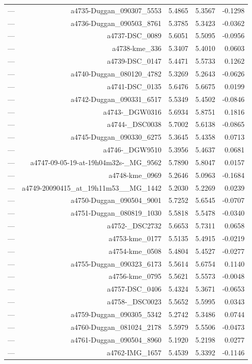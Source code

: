 \begin{table}[htbp]
\begin{tabular}{lrrrr}
— & a4735-Duggan_090307_5553 & 5.4865 & 5.3567 & -0.1298 \\
— & a4736-Duggan_090503_8761 & 5.3785 & 5.3423 & -0.0362 \\
— & a4737-DSC_0089 & 5.6051 & 5.5095 & -0.0956 \\
— & a4738-kme_336 & 5.3407 & 5.4010 & 0.0603 \\
— & a4739-DSC_0147 & 5.4471 & 5.5733 & 0.1262 \\
— & a4740-Duggan_080120_4782 & 5.3269 & 5.2643 & -0.0626 \\
— & a4741-DSC_0135 & 5.6476 & 5.6675 & 0.0199 \\
— & a4742-Duggan_090331_6517 & 5.5349 & 5.4502 & -0.0846 \\
— & a4743-_DGW0316 & 5.6934 & 5.8751 & 0.1816 \\
— & a4744-_DSC0038 & 5.7002 & 5.6138 & -0.0865 \\
— & a4745-Duggan_090330_6275 & 5.3645 & 5.4358 & 0.0713 \\
— & a4746-_DGW9510 & 5.3956 & 5.4637 & 0.0681 \\
— & a4747-09-05-19-at-19h04m32s-_MG_9562 & 5.7890 & 5.8047 & 0.0157 \\
— & a4748-kme_0969 & 5.2646 & 5.0963 & -0.1684 \\
— & a4749-20090415_at_19h11m53__MG_1442 & 5.2030 & 5.2269 & 0.0239 \\
— & a4750-Duggan_090504_9001 & 5.7252 & 5.6545 & -0.0707 \\
— & a4751-Duggan_080819_1030 & 5.5818 & 5.5478 & -0.0340 \\
— & a4752-_DSC2732 & 5.6653 & 5.7311 & 0.0658 \\
— & a4753-kme_0177 & 5.5135 & 5.4915 & -0.0219 \\
— & a4754-kme_0508 & 5.4804 & 5.4527 & -0.0277 \\
— & a4755-Duggan_090323_6173 & 5.5614 & 5.6754 & 0.1140 \\
— & a4756-kme_0795 & 5.5621 & 5.5573 & -0.0048 \\
— & a4757-DSC_0406 & 5.4324 & 5.3671 & -0.0653 \\
— & a4758-_DSC0023 & 5.5652 & 5.5995 & 0.0343 \\
— & a4759-Duggan_090305_5342 & 5.2742 & 5.3486 & 0.0744 \\
— & a4760-Duggan_081024_2178 & 5.5979 & 5.5506 & -0.0473 \\
— & a4761-Duggan_090504_8960 & 5.1920 & 5.2198 & 0.0277 \\
— & a4762-IMG_1657 & 5.4539 & 5.3392 & -0.1146 \\

\end{tabular}
\end{table}
